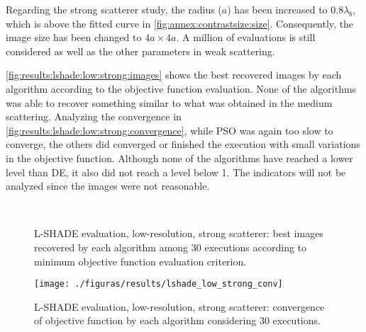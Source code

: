 			Regarding the strong scatterer study, the radius ($a$) has been increased to $0.8\lambda_b$, which is above the fitted curve in \autoref{fig:annex:contrastsize:size}. Consequently, the image size has been changed to $4a\times4a$. A million of evaluations is still considered as well as the other parameters in weak scattering.
			
			\autoref{fig:results:lshade:low:strong:images} shows the best recovered images by each algorithm according to the objective function evaluation. None of the algorithms was able to recover something similar to what was obtained in the medium scattering. Analyzing the convergence in \autoref{fig:results:lshade:low:strong:convergence}, while PSO was again too slow to converge, the others did converged or finished the execution with small variations in the objective function. Although none of the algorithms have reached a lower level than DE, it also did not reach a level below 1. The indicators will not be analyzed since the images were not reasonable.
		
			\begin{figure}
				\centering
				 \\
				\caption[L-SHADE evaluation, low-resolution, strong scatterer: best recovered images.]{L-SHADE evaluation, low-resolution, strong scatterer: best images recovered by each algorithm among 30 executions according to minimum objective function evaluation criterion.}
				\label{fig:results:lshade:low:strong:images}
			\end{figure}
		
			\begin{figure}
				\centering
				\texttt{[image: ./figuras/results/lshade\_low\_strong\_conv]}
				\caption[L-SHADE evaluation, low-resolution, strong scatterer: convergence.]{L-SHADE evaluation, low-resolution, strong scatterer: convergence of objective function by each algorithm considering 30 executions.}
				\label{fig:results:lshade:low:strong:convergence}
			\end{figure}
		
